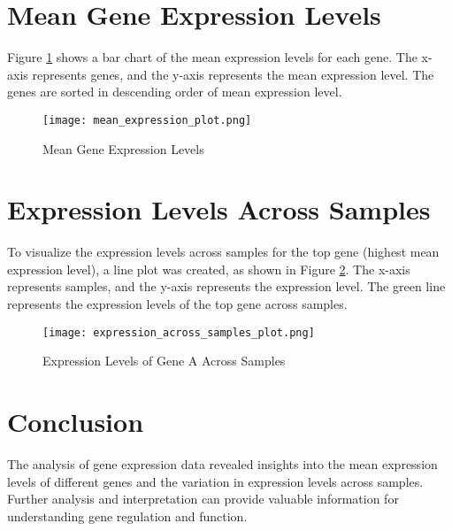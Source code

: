 \documentclass{article}
\begin{document}
\section{Mean Gene Expression Levels}
Figure \ref{fig:mean_expression_plot} shows a bar chart of the mean expression levels for each gene. The x-axis represents genes, and the y-axis represents the mean expression level. The genes are sorted in descending order of mean expression level.

\begin{figure}[H]
\centering
\texttt{[image: mean\_expression\_plot.png]}
\caption{Mean Gene Expression Levels}
\label{fig:mean_expression_plot}
\end{figure}

\section{Expression Levels Across Samples}
To visualize the expression levels across samples for the top gene (highest mean expression level), a line plot was created, as shown in Figure \ref{fig:expression_across_samples_plot}. The x-axis represents samples, and the y-axis represents the expression level. The green line represents the expression levels of the top gene across samples.

\begin{figure}[H]
\centering
\texttt{[image: expression\_across\_samples\_plot.png]}
\caption{Expression Levels of Gene A Across Samples}
\label{fig:expression_across_samples_plot}
\end{figure}

\section{Conclusion}
The analysis of gene expression data revealed insights into the mean expression levels of different genes and the variation in expression levels across samples. Further analysis and interpretation can provide valuable information for understanding gene regulation and function.
\end{document}
